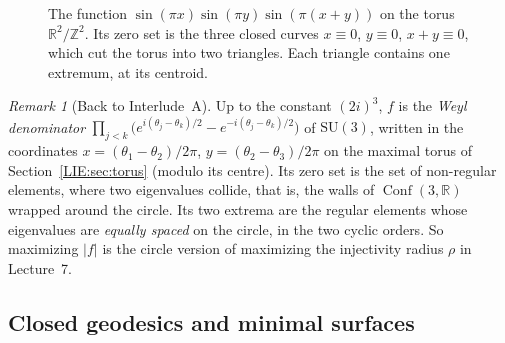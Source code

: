 \documentclass[11pt,openany]{book}
\theoremstyle{plain}
\theoremstyle{definition}
\theoremstyle{remark}
\newtheorem{remark}[theorem]{Remark}
\newcommand{\R}{\mathbb{R}}
\newcommand{\Z}{\mathbb{Z}}
\newcommand{\Conf}{\operatorname{Conf}}
\newcommand{\abs}[1]{\left\lvert #1 \right\rvert}
\begin{document}
\begin{figure}[ht]
\centering
{}
\caption{The function $\sin(\pi x)\sin(\pi y)\sin(\pi(x+y))$ on the torus $\R^2/\Z^2$. Its zero set is the
three closed curves $x\equiv0$, $y\equiv0$, $x+y\equiv0$, which cut the torus into two triangles. Each
triangle contains one extremum, at its centroid.}
\label{TOP:fig:torus}
\end{figure}

\begin{remark}[Back to Interlude~A]
Up to the constant $(2i)^3$, $f$ is the \emph{Weyl denominator}
$\prod_{j<k}\big(e^{i(\theta_j-\theta_k)/2}-e^{-i(\theta_j-\theta_k)/2}\big)$ of $\mathrm{SU}(3)$, written
in the coordinates $x=(\theta_1-\theta_2)/2\pi$, $y=(\theta_2-\theta_3)/2\pi$ on the maximal torus of
Section~\ref{LIE:sec:torus} (modulo its centre). Its zero set is the set of non-regular elements, where two
eigenvalues collide, that is, the walls of $\Conf(3,\R)$ wrapped around the circle. Its two extrema are
the regular elements whose eigenvalues are \emph{equally spaced} on the circle, in the two cyclic orders.
So maximizing $\abs f$ is the circle version of maximizing the injectivity radius $\rho$ in Lecture~7.
\end{remark}

\subsection{Closed geodesics and minimal surfaces}
\label{TOP:sec:geodesics}
\end{document}
